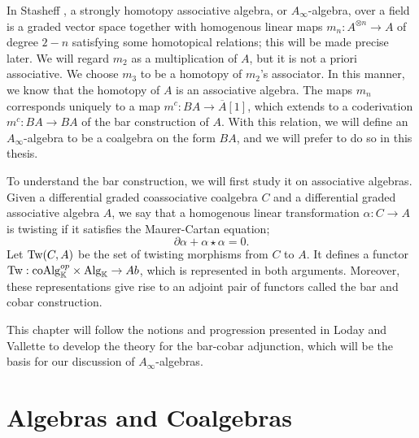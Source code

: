 \documentclass[../thesis.tex]{subfiles}
\begin{document}
        In Stasheff \cite{Stasheff63}, a strongly homotopy associative algebra, or $A_\infty$-algebra, over a field is a graded vector space together with homogenous linear maps $m_n: A^{\otimes n}\rightarrow A$ of degree $2-n$ satisfying some homotopical relations; this will be made precise later. We will regard $m_2$ as a multiplication of $A$, but it is not a priori associative. We choose $m_3$ to be a homotopy of $m_2$'s associator. In this manner, we know that the homotopy of $A$ is an associative algebra. The maps $m_n$ corresponds uniquely to a map $m^c:BA\rightarrow \overline{A}[1]$, which extends to a coderivation $m^c : BA\rightarrow BA$ of the bar construction of $A$. With this relation, we will define an $A_\infty$-algebra to be a coalgebra on the form $BA$, and we will prefer to do so in this thesis.


        To understand the bar construction, we will first study it on associative algebras. Given a differential graded coassociative coalgebra $C$ and a differential graded associative algebra $A$, we say that a homogenous linear transformation $\alpha: C\rightarrow A$ is twisting if it satisfies the Maurer-Cartan equation;
            \begin{equation*}
                \partial\alpha + \alpha\star\alpha = 0.
            \end{equation*}
        Let $\tt{Tw}(C, A)$ be the set of twisting morphisms from $C$ to $A$. It defines a functor $\tt{Tw}: \tt{coAlg}_{\mathbb{K}}^{op}\times \tt{Alg}_{\mathbb{K}} \rightarrow Ab$, which is represented in both arguments. Moreover, these representations give rise to an adjoint pair of functors called the bar and cobar construction.

        \begin{center}
        \end{center}

        This chapter will follow the notions and progression presented in Loday and Vallette \cite{Loday12} to develop the theory for the bar-cobar adjunction, which will be the basis for our discussion of $A_\infty$-algebras.

    \section{Algebras and Coalgebras}    
\end{document}
